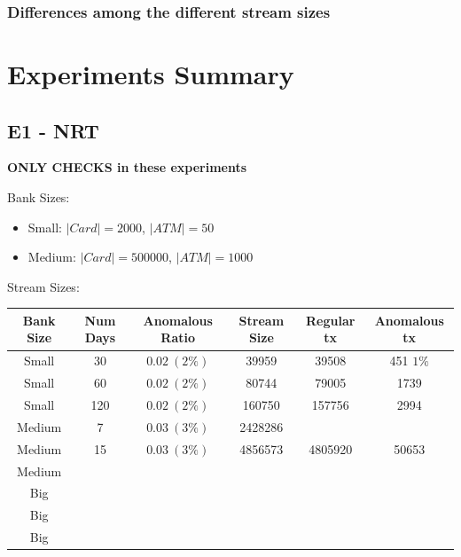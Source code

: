 \documentclass[12pt,a4paper]{article}
\begin{document}
\subsubsection{Differences among the different stream sizes}

\section{Experiments Summary}


\subsection{E1 - NRT}

\textbf{ONLY CHECKS in these experiments}

Bank Sizes:
\begin{itemize}
    \item Small: $|Card| = 2000$, $|ATM| = 50$
    \item Medium: $|Card| = 500000$,  $|ATM| = 1000$
\end{itemize}

Stream Sizes:


\begin{table}[H]
    \begin{tabular}{|c|c|c|c|c|c|}
    \hline
    Bank Size & Num Days & Anomalous Ratio & Stream Size & Regular tx & Anomalous tx \\ \hline
    Small     & 30       & $0.02\ (2\%)$   & 39959       & 39508      & 451 $1\%$    \\ \hline
    Small     & 60       & $0.02\ (2\%)$   & 80744       & 79005      & 1739         \\ \hline
    Small     & 120      & $0.02\ (2\%)$   & 160750      & 157756     & 2994         \\ \hline
    Medium    & 7        & $0.03\ (3\%)$   & 2428286     &            &              \\ \hline
    Medium    & 15       & $0.03\ (3\%)$   & 4856573     & 4805920    & 50653        \\ \hline
    Medium    &          &                 &             &            &              \\ \hline
    Big       &          &                 &             &            &              \\ \hline
    Big       &          &                 &             &            &              \\ \hline
    Big       &          &                 &             &            &              \\ \hline
    \end{tabular}
\end{table}
    
\end{document}
